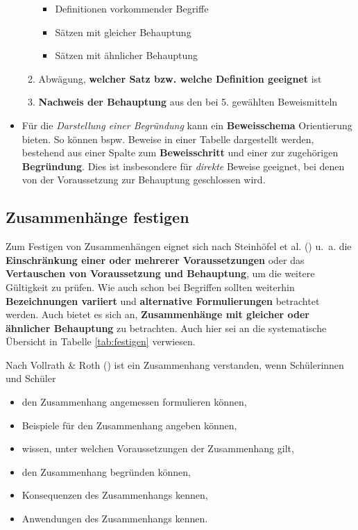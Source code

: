 \documentclass[
]{scrbook}
\providecommand{\tightlist}{%
  \setlength{\itemsep}{0pt}\setlength{\parskip}{0pt}}
\theoremstyle{definition}
\theoremstyle{definition}
\theoremstyle{definition}
\theoremstyle{definition}
\theoremstyle{remark}
\begin{document}
\begin{itemize}
\begin{enumerate}
    \begin{itemize}
    \tightlist
    \item
      Definitionen vorkommender Begriffe
    \item
      Sätzen mit gleicher Behauptung
    \item
      Sätzen mit ähnlicher Behauptung
    \end{itemize}
  \item
    Abwägung, \textbf{welcher Satz bzw. welche Definition geeignet} ist
  \item
    \textbf{Nachweis der Behauptung} aus den bei 5. gewählten Beweismitteln
  \end{enumerate}
\item
  Für die \emph{Darstellung einer Begründung} kann ein \textbf{Beweisschema} Orientierung bieten. So können bspw. Beweise in einer Tabelle dargestellt werden, bestehend aus einer Spalte zum \textbf{Beweisschritt} und einer zur zugehörigen \textbf{Begründung}. Dies ist insbesondere für \emph{direkte} Beweise geeignet, bei denen von der Voraussetzung zur Behauptung geschlossen wird.
\end{itemize}

\subsection{Zusammenhänge festigen}\label{zusammenhuxe4nge-festigen}

Zum Festigen von Zusammenhängen eignet sich nach Steinhöfel et al. () u.~a. die \textbf{Einschränkung einer oder mehrerer Voraussetzungen} oder das \textbf{Vertauschen von Voraussetzung und Behauptung}, um die weitere Gültigkeit zu prüfen. Wie auch schon bei Begriffen sollten weiterhin \textbf{Bezeichnungen variiert} und \textbf{alternative Formulierungen} betrachtet werden. Auch bietet es sich an, \textbf{Zusammenhänge mit gleicher oder ähnlicher Behauptung} zu betrachten. Auch hier sei an die systematische Übersicht in Tabelle \ref{tab:festigen} verwiesen.

Nach Vollrath \& Roth () ist ein Zusammenhang verstanden, wenn Schülerinnen und Schüler

\begin{itemize}
\tightlist
\item
  den Zusammenhang angemessen formulieren können,\\
\item
  Beispiele für den Zusammenhang angeben können,\\
\item
  wissen, unter welchen Voraussetzungen der Zusammenhang gilt,\\
\item
  den Zusammenhang begründen können,\\
\item
  Konsequenzen des Zusammenhangs kennen,\\
\item
  Anwendungen des Zusammenhangs kennen.
\end{itemize}
\end{document}

